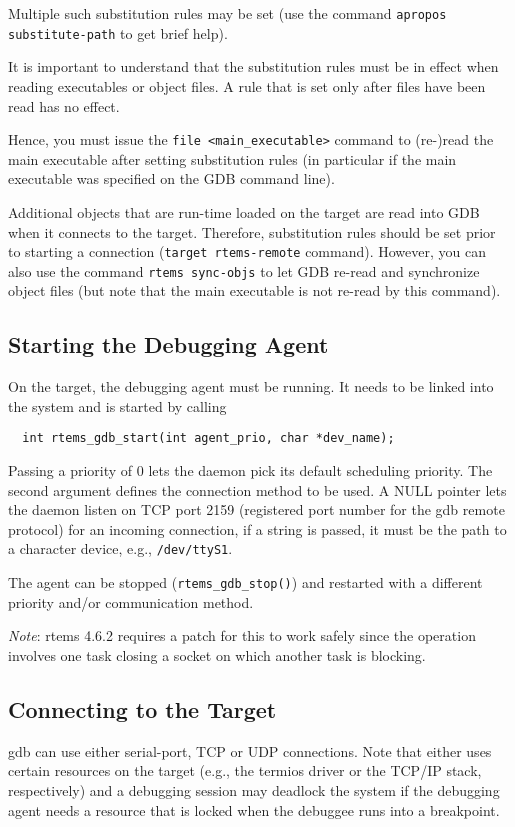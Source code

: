 \documentclass{article}
\begin{document}
\begin{description}
	Multiple such substitution rules may be set
	(use the command {\tt apropos substitute-path} to get brief help).

	It is important to understand that the substitution rules
	must be in effect when reading executables or object files.
	A rule that is set only after files have been read has
	no effect.

	Hence, you must issue the {\tt file <main\_executable>}
	command to (re-)read the main executable after setting
	substitution rules (in particular if the main executable
	was specified on the GDB command line).

	Additional objects that are run-time loaded on the target
	are read into GDB when it connects to the target. Therefore,
	substitution rules should be set prior to starting
	a connection ({\tt target rtems-remote} command).
	However, you can also use the command {\tt rtems sync-objs}
	to let GDB re-read and synchronize object files (but
	note that the main executable is not re-read by this
	command).
\end{description}

\subsection{Starting the Debugging Agent}
	On the target, the debugging agent must be running.
	It needs to be linked into the system and is started
	by calling
\begin{verbatim}
  int rtems_gdb_start(int agent_prio, char *dev_name);
\end{verbatim}

	Passing a priority of 0 lets the daemon pick its default
	scheduling priority. The second argument defines the
	connection method to be used. A NULL pointer lets the
	daemon listen on TCP port 2159 (registered port number for the
	gdb remote protocol) for an incoming connection,
	if a string is passed, it must be the path to a character
	device, e.g., {\tt /dev/ttyS1}.

	The agent can be stopped (\verb|rtems_gdb_stop()|) and restarted
	with a different priority and/or communication method.

	{\em Note\/}: rtems 4.6.2 requires a patch for this to work safely
	since the operation involves one task closing a socket
	on which another task is blocking.

\subsection{Connecting to the Target}
	gdb can use either serial-port, TCP or UDP connections.
	Note that either uses certain resources on the target (e.g.,
	the termios driver or the TCP/IP stack, respectively)
	and a debugging session may deadlock the system if
	the debugging agent needs a resource that is locked
	when the debuggee runs into a breakpoint.
\end{document}
